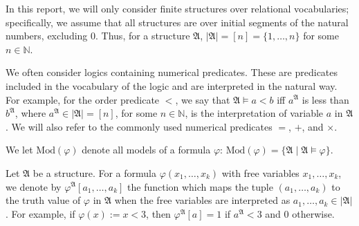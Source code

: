 \documentclass[a4paper,UKenglish,cleveref, autoref, thm-restate, anonymous]{lipics-v2021}
\begin{document}
\begin{remark}
    In this report, we will only consider finite structures over relational vocabularies; specifically, we assume that all structures are over initial segments of the natural numbers, excluding $0$. Thus, for a structure $\mathfrak{A}$, $|\mathfrak{A}| = [n] = \{1, \dots, n\}$ for some $n \in \mathbb{N}$.
\end{remark}

\begin{remark}
    We often consider logics containing numerical predicates. These are predicates included in the vocabulary of the logic and are interpreted in the natural way. For example, for the order predicate $<$, we say that $\mathfrak{A} \models a < b$ iff $a^\mathfrak{A}$ is less than $b^\mathfrak{A}$, where $a^\mathfrak{A} \in |\mathfrak{A}| = [n]$, for some $n \in \mathbb{N}$, is the interpretation of variable $a$ in $\mathfrak{A}$. We will also refer to the commonly used numerical predicates $=$, $+$, and $\times$.
\end{remark}

\begin{remark}
    We let $\text{Mod}(\varphi)$ denote all models of a formula $\varphi$: \( \text{Mod}(\varphi) = \{\mathfrak{A} \mid \mathfrak{A} \models \varphi\}.\)
\end{remark}

\begin{remark}
    Let $\mathfrak{A}$ be a structure. For a formula $\varphi(x_1, \dots, x_k)$ with free variables $x_1, \dots, x_k$, we denote by $\varphi^\mathfrak{A}[a_1, \dots, a_k]$ the function which maps the tuple $(a_1, \dots, a_k)$ to the truth value of $\varphi$ in $\mathfrak{A}$ when the free variables are interpreted as $a_1, \dots, a_k \in |\mathfrak{A}|$. For example, if $\varphi(x) := x < 3$, then $\varphi^\mathfrak{A}[a] = 1$ if $a^\mathfrak{A} < 3$ and $0$ otherwise.
\end{remark}

\iffalse

\end{document}
